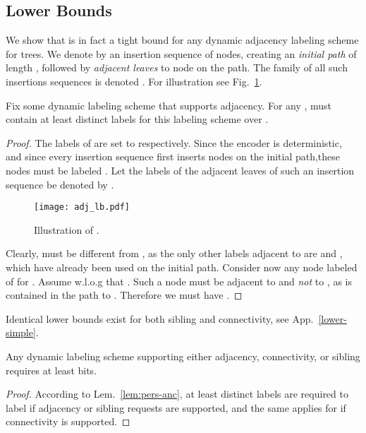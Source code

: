\documentclass{llncs}
\newcommand{\drop}[1]{}
\begin{document}
\subsection{ Lower Bounds}
We  show that  is in fact a tight bound for any dynamic adjacency labeling scheme for trees.
We denote  by  an  insertion sequence   of   nodes, creating  an \emph{initial  path} of length , followed by    \emph{adjacent leaves}  to node  on the path.
The family of all such insertions sequences is denoted . For illustration see Fig.~\ref{fig:AdjLowerBound}.


\begin{lemma}\label{lem:pers-anc}
Fix some dynamic labeling scheme that supports adjacency. For any ,  must contain at least  distinct labels \drop{wrt.} for this labeling scheme over .
\end{lemma}

\begin{proof}
The labels of  are set to   respectively.
Since the encoder is deterministic, and since every insertion sequence
 first  inserts nodes on the initial  path,these nodes must be labeled
. Let the labels of the adjacent leaves of such an insertion
sequence be denoted by .

			\begin{figure} [h]
				\centering
				\texttt{[image: adj\_lb.pdf]}
				\caption{Illustration of . }
				\label{fig:AdjLowerBound}
			\end{figure}


Clearly,  must be different from , as the only other labels adjacent to  are  and , which have already been used on the initial path.
 Consider now any node labeled  of  for . Assume w.l.o.g that . Such a node must be adjacent to  and
 \emph{not} to , as  is contained in the path to . Therefore we must have .
\end{proof}

Identical lower bounds exist for both sibling and connectivity, see App.~\ref{lower-simple}.
\begin{theorem}\label{thm:simple-dyn}
Any dynamic labeling scheme supporting either  adjacency, connectivity, or sibling  requires at least  bits.
\end{theorem}
\begin{proof}
According to Lem.~\ref{lem:pers-anc}, at least  distinct labels are required to label  if adjacency or
sibling requests are supported, and the same applies for   if
connectivity is supported.
\end{proof}
\end{document}
